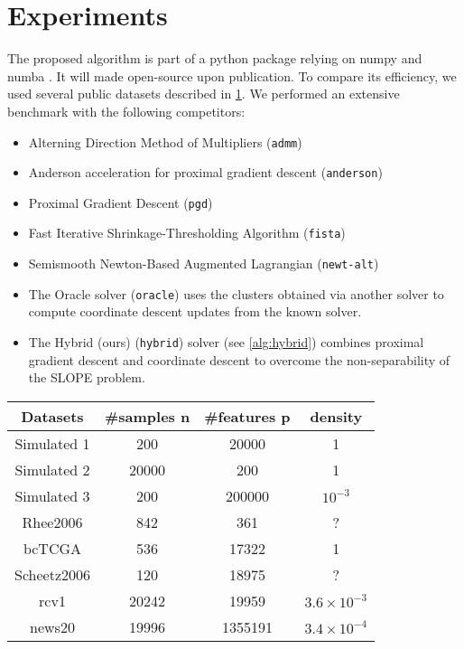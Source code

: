 \section{Experiments}\label{sec:experiments}

The proposed algorithm is part of a python package relying on numpy and numba \cite{harris2020,lam2015}.
It will made open-source upon publication. To compare its efficiency, we used several public datasets described in \cref{table:datasets}.
We performed an extensive benchmark with the following competitors:
\begin{itemize}[noitemsep]
    \item Alterning Direction Method of Multipliers (\texttt{admm}) \cite{boyd2010}
    \item Anderson acceleration for proximal gradient descent (\texttt{anderson}) \cite{zhang2020}
    \item Proximal Gradient Descent (\texttt{pgd}) \cite{combettes2005}
    \item Fast Iterative Shrinkage-Thresholding Algorithm (\texttt{fista}) \cite{beck2009}
    \item Semismooth Newton-Based Augmented Lagrangian (\texttt{newt-alt}) \cite{Ziyan2019}
    \item The Oracle solver (\texttt{oracle}) uses the clusters obtained via another
     solver to compute coordinate descent updates from the known solver.
    \item The Hybrid (ours) (\texttt{hybrid}) solver (see \cref{alg:hybrid}) combines proximal gradient descent
     and coordinate descent to overcome the non-separability of the SLOPE problem.
\end{itemize}

\begin{table}[]
    \centering
    \label{table:datasets}
    \begin{tabular}{cccc}
    \hline
    Datasets    & \#samples n & \#features p & density \\ \hline
    Simulated 1 & 200 & \num{20000} & 1 \\
    Simulated 2 & \num{20000} & \num{200} & 1 \\
    Simulated 3 & 200 & \num{200000} & $10^{-3}$ \\ 
    Rhee2006    & 842         & 361          & ?       \\ 
    bcTCGA      & 536         & \num{17322}        & 1       \\
    Scheetz2006 & 120         & \num{18975}        & ?       \\
    rcv1 & \num{20242} & \num{19959} & $3.6 \times 10^{-3}$ \\ 
    news20 & \num{19996} & \num{1355191} & $3.4 \times 10^{-4}$ \\\hline
    \end{tabular}
\end{table}

